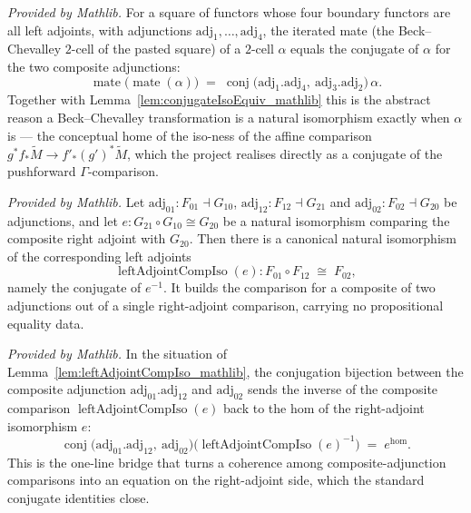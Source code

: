 \begin{lemma}
  \label{lem:iterated_mateEquiv_conjugateEquiv_mathlib}
  \mathlibok
  \textit{Provided by Mathlib.}
  For a square of functors whose four boundary functors are all left adjoints, with adjunctions
  \(\mathrm{adj}_1, \dots, \mathrm{adj}_4\), the iterated mate (the Beck--Chevalley \(2\)-cell of the
  pasted square) of a \(2\)-cell \(\alpha\) equals the conjugate of \(\alpha\) for the two composite
  adjunctions:
  \[
    \operatorname{mate}\bigl(\operatorname{mate}(\alpha)\bigr) \;=\;
      \operatorname{conj}\bigl(\mathrm{adj}_1.\mathrm{adj}_4,\ \mathrm{adj}_3.\mathrm{adj}_2\bigr)\,\alpha .
  \]
  Together with Lemma~\ref{lem:conjugateIsoEquiv_mathlib} this is the abstract reason a Beck--Chevalley
  transformation is a natural isomorphism exactly when \(\alpha\) is — the conceptual home of the
  iso-ness of the affine comparison \(g^* f_*\widetilde M \to f'_*(g')^*\widetilde M\), which the
  project realises directly as a conjugate of the pushforward \(\Gamma\)-comparison.
\end{lemma}

\begin{lemma}
  \label{lem:leftAdjointCompIso_mathlib}
  \mathlibok
  \textit{Provided by Mathlib.}
  Let \(\mathrm{adj}_{01} : F_{01} \dashv G_{10}\), \(\mathrm{adj}_{12} : F_{12} \dashv G_{21}\) and
  \(\mathrm{adj}_{02} : F_{02} \dashv G_{20}\) be adjunctions, and let
  \(e : G_{21} \circ G_{10} \cong G_{20}\) be a natural isomorphism comparing the composite right adjoint
  with \(G_{20}\). Then there is a canonical natural isomorphism of the corresponding left adjoints
  \[
    \operatorname{leftAdjointCompIso}(e) : F_{01} \circ F_{12} \;\cong\; F_{02},
  \]
  namely the conjugate of \(e^{-1}\). It builds the comparison for a composite of two adjunctions out of
  a single right-adjoint comparison, carrying no propositional equality data.
\end{lemma}

\begin{lemma}
  \label{lem:conjugateEquiv_leftAdjointCompIso_inv_mathlib}
  \mathlibok
  \textit{Provided by Mathlib.}
  In the situation of Lemma~\ref{lem:leftAdjointCompIso_mathlib}, the conjugation bijection between the
  composite adjunction \(\mathrm{adj}_{01}.\mathrm{adj}_{12}\) and \(\mathrm{adj}_{02}\) sends the inverse
  of the composite comparison \(\operatorname{leftAdjointCompIso}(e)\) back to the hom of the
  right-adjoint isomorphism \(e\):
  \[
    \operatorname{conj}\bigl(\mathrm{adj}_{01}.\mathrm{adj}_{12},\ \mathrm{adj}_{02}\bigr)
      \bigl(\operatorname{leftAdjointCompIso}(e)^{-1}\bigr) \;=\; e^{\mathrm{hom}} .
  \]
  This is the one-line bridge that turns a coherence among composite-adjunction comparisons into an
  equation on the right-adjoint side, which the standard conjugate identities close.
\end{lemma}

